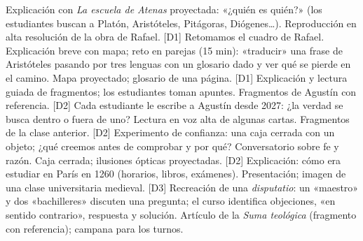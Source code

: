 \documentclass[parcelacion]{planeacion}
\begin{document}
\begin{parcelacion}
    {Explicación con \emph{La escuela de Atenas} proyectada: «¿quién es quién?» (los estudiantes
     buscan a Platón, Aristóteles, Pitágoras, Diógenes…).}
    {Reproducción en alta resolución de la obra de Rafael.}
    { {\scriptsize[D1]}}
    {Retomamos el cuadro de Rafael. Explicación breve con mapa; reto en parejas (15 min):
     «traducir» una frase de Aristóteles pasando por tres lenguas con un glosario dado y ver qué se
     pierde en el camino.}
    {Mapa proyectado; glosario de una página.}
    { {\scriptsize[D1]}}
    {Explicación y lectura guiada de fragmentos; los estudiantes toman apuntes.}
    {Fragmentos de Agustín con referencia.}
    { {\scriptsize[D2]}}
    {Cada estudiante le escribe a Agustín desde 2027: ¿la verdad se busca dentro o fuera de uno?
     Lectura en voz alta de algunas cartas.}
    {Fragmentos de la clase anterior.}
    { {\scriptsize[D2]}}
    {Experimento de confianza: una caja cerrada con un objeto; ¿qué creemos antes de comprobar y
     por qué? Conversatorio sobre fe y razón.}
    {Caja cerrada; ilusiones ópticas proyectadas.}
    { {\scriptsize[D2]}}
    {Explicación: cómo era estudiar en París en 1260 (horarios, libros, exámenes).}
    {Presentación; imagen de una clase universitaria medieval.}
    { {\scriptsize[D3]}}
    {Recreación de una \emph{disputatio}: un «maestro» y dos «bachilleres» discuten una pregunta;
     el curso identifica objeciones, «en sentido contrario», respuesta y solución.}
    {Artículo de la \emph{Suma teológica} (fragmento con referencia); campana para los turnos.}

\end{parcelacion}
\end{document}
